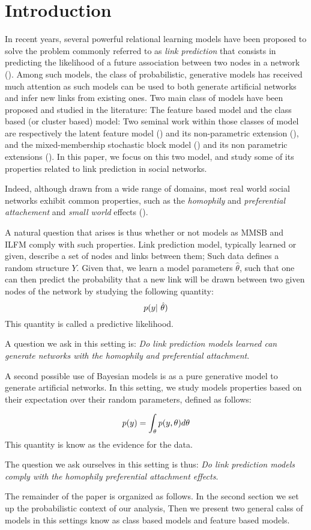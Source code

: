 \section{Introduction}
\label{sec:introduction}
In recent years, several powerful relational learning models have been proposed to solve the problem commonly referred to as \textit{link prediction} that consists in predicting the likelihood of a future association between two nodes in a network (\cite{Liben-Nowell07, HassanZaki11}). Among such models, the class of probabilistic, generative models has received much attention as such models can be used to both generate artificial networks and infer new links from existing ones. Two main class of models have been proposed and studied in the literature: The feature based model and the class based (or cluster based) model: Two seminal work within those classes of model are respectively the latent feature model (\cite{BMF}) and its non-parametric extension (\cite{ILFRM}), and the mixed-membership stochastic block model (\cite{MMSB}) and its non parametric extensions (\cite{iMMSB,diMMSB}). In this paper, we focus on this two model, and study some of its properties related to link prediction in social networks. 

Indeed, although drawn from a wide range of domains, most real world social networks exhibit common properties, such as the \textit{homophily} and \textit{preferential attachement} and \textit{small world} effects (\cite{Newman2010, Barabasi2003}). 


A natural question that arises is thus whether or not models as MMSB and ILFM comply with such properties. Link prediction model, typically learned or given, describe a set of nodes and links between them; Such data defines a random structure $Y$. Given that, we learn a model parameters $\hat \theta$, such that one can then predict the probability that a new link will be drawn between two given nodes of the network by studying the following quantity:
\begin{equation}
\p(y | \hat \theta)
\end{equation}
This quantity is called a predictive likelihood.


A question we ask in this setting is: \textit{Do link prediction models learned can generate networks with the homophily and preferential attachment}.

A second possible use of Bayesian models is as a pure generative model to generate artificial networks. In this setting, we study models properties based on their expectation over their random parameters, defined as follows:

\begin{equation}
p(y) = \int_{\theta} p(y,\theta) d\theta
\end{equation}
This quantity is know as the evidence for the data.

The question we ask ourselves in this setting is thus: \textit{Do link prediction models comply with the homophily preferential attachment effects}.


The remainder of the paper is organized as follows. In the second section we set up the probabilistic context of our analysis, Then we present two general calss of models in this settings know as class based models and feature based models.
